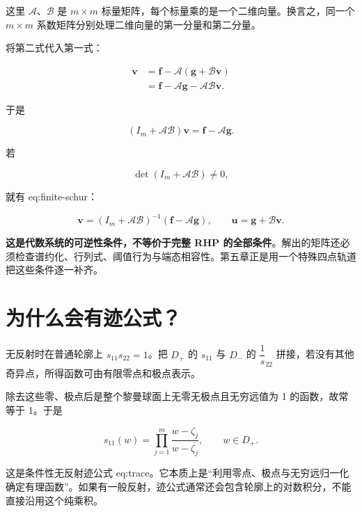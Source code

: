 这里 $\mathcal A$、$\mathcal B$ 是 $m\times{}m$ 标量矩阵，每个标量乘的是一个二维向量。换言之，同一个 $m\times{}m$ 系数矩阵分别处理二维向量的第一分量和第二分量。\par

将第二式代入第一式：\par

\[
\begin{aligned}
\boldsymbol v
&=\boldsymbol f-\mathcal A(\boldsymbol g+\mathcal B\boldsymbol v)\\
&=\boldsymbol f-\mathcal A\boldsymbol g-\mathcal A\mathcal B\boldsymbol v.
\end{aligned}
\]

于是\par

\[
(I_m+\mathcal A\mathcal B)\boldsymbol v
=\boldsymbol f-\mathcal A\boldsymbol g.
\]

若\par

\[
\det(I_m+\mathcal A\mathcal B)\ne0,
\]

就有 eq:finite-schur：\par

\[
\boxed{
\boldsymbol v=(I_m+\mathcal A\mathcal B)^{-1}
(\boldsymbol f-\mathcal A\boldsymbol g),
\qquad
\boldsymbol u=\boldsymbol g+\mathcal B\boldsymbol v.
}
\]

\textbf{这是代数系统的可逆性条件，不等价于完整 RHP 的全部条件}。解出的矩阵还必须检查谱约化、行列式、阈值行为与端态相容性。第五章正是用一个特殊四点轨道把这些条件逐一补齐。\par

\section{为什么会有迹公式？}
\par

无反射时在普通轮廓上 $s_{11}s_{22}=1$。把 $D_{+}$ 的 $s_{11}$ 与 $D_{-}$ 的 $\dfrac{1}{s}_{22}$ 拼接，若没有其他奇异点，所得函数可由有限零点和极点表示。\par

除去这些零、极点后是整个黎曼球面上无零无极点且无穷远值为 1 的函数，故常等于 1。于是\par

\[
s_{11}(w)
=\prod\limits_{j=1}^{m}
\dfrac{w-\zeta_j}{w-\overline{\zeta_j}},
\qquad w\in D_+.
\]

这是条件性无反射迹公式 eq:trace。它本质上是“利用零点、极点与无穷远归一化确定有理函数”。如果有一般反射，迹公式通常还会包含轮廓上的对数积分，不能直接沿用这个纯乘积。\par


